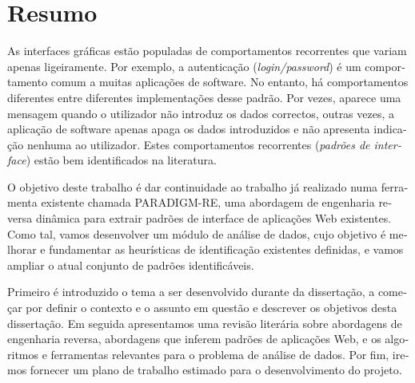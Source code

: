 \chapter*{Resumo}
\begin{otherlanguage}{portuguese}
As interfaces gráficas estão populadas de comportamentos recorrentes que variam apenas ligeiramente. Por exemplo, a autenticação (\textit{login/password}) é um comportamento comum a muitas aplicações de software. No entanto, há comportamentos diferentes entre diferentes implementações desse padrão. Por vezes, aparece uma mensagem quando o utilizador não introduz os dados correctos, outras vezes, a aplicação de software apenas apaga os dados introduzidos e não apresenta indicação nenhuma ao utilizador. Estes comportamentos recorrentes (\textit{padrões de interface}) estão bem identificados na literatura. 

O objetivo deste trabalho é dar continuidade ao trabalho já realizado numa ferramenta existente chamada PARADIGM-RE, uma abordagem de engenharia reversa dinâmica para extrair padrões de interface de aplicações Web existentes. Como tal, vamos desenvolver um módulo de análise de dados, cujo objetivo é melhorar e fundamentar as heurísticas de identificação existentes definidas, e vamos ampliar o atual conjunto de padrões identificáveis.

Primeiro é introduzido o tema a ser desenvolvido durante da dissertação, a começar por definir o contexto e o assunto em questão e descrever os objetivos desta dissertação. Em seguida apresentamos uma revisão literária sobre abordagens de engenharia reversa, abordagens que inferem padrões de aplicações Web, e os algoritmos e ferramentas relevantes para o problema de análise de dados. Por fim, iremos fornecer um plano de trabalho estimado para o desenvolvimento do projeto.
\end{otherlanguage}
